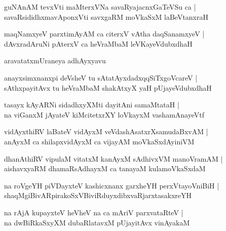 \documentclass[twoside,12pt,openright]{book}
\newcounter{shloka}[chapter]
\begin{document}
\begin{shloka}%
guNAnAM tevxVti maMterxVNa savaRyajacnxGaTeVSu ca |\\
savaRsididhxmavAponxVti savxgaRM moVkaSxM laBeVtanxraH 
\end{shloka}

\begin{shloka}%
maqNamxyeV parxtimAyAM ca citerxV vAtha daqSanamxyeV |\\
dAvxradAruNi pAterxV ca heVraMbaM leVKayeVdubxdhaH 
\end{shloka}

\begin{center}
aravatatxmUraneya adhAyxyavu
\end{center}

\begin{shloka}%
anayxsimxnanxpi deVsheV tu sAtatAyxdadxqqSiTxgoVcareV |\\
sAthxpayitAvx tu heVraMbaM shakAtxyX yaH pUjayeVdubxdhaH 
\end{shloka}

\begin{shloka}%
tasayx kAyARNi sidadhxyXMti dayitAni samaMtataH |\\
na viGanxM jAyateV kiMcitetxrXY loVkayxM vashamAnayeVtf 
\end{shloka}

\begin{shloka}%
vidAyxthiRV laBateV vidAyxM veVdashAsatxrXsamudaBxvAM |\\
anAyxM ca shilapxvidAyxM ca vijayAM moVkaSxdAyiniVM 
\end{shloka}

\begin{shloka}%
dhanAthiRV vipulaM vitatxM kanAyxM sAdhivxVM manoVramAM |\\
aishavxyaRM dhamaRsAdhayxM ca tanayaM kulamoVkaSxdaM 
\end{shloka}

\begin{shloka}%
na roVgeYH piVDayxteV kashicxnanx garxheYH perxVtayoVniBiH |\\
shaqMgiBivARpirakoSxVBiviRduyxdibxvaRjarxtasakxreYH 
\end{shloka}

\begin{shloka}%
na rAjA kupayxteV heVheV na ca mAriV parxvataRteV |\\
na dwBiRkaSxyXM dubaRlatavxM pUjayitAvx vinAyakaM 
\end{shloka}
\end{document}

